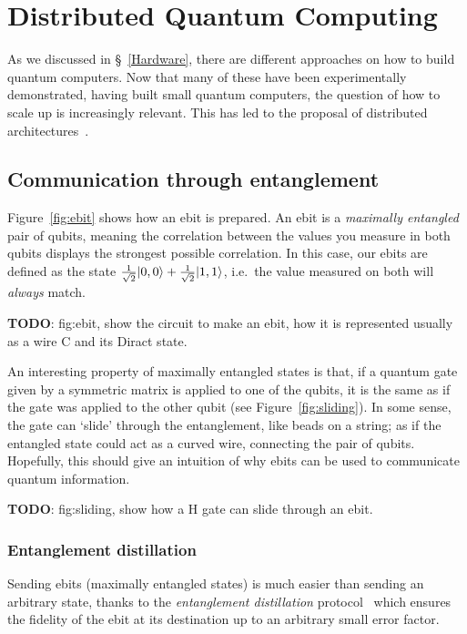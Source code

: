 \chapter{Distributed Quantum Computing}
\label{chap:Distributed}

As we discussed in \S~\ref{Hardware}, there are different approaches on how to build quantum computers. Now that many of these have been experimentally demonstrated, having built small quantum computers, the question of how to scale up is increasingly relevant. This has led to the proposal of distributed architectures~\citep{ArchitectureSurvey}.

\section{Communication through entanglement}
\label{Ebits}


Figure~\ref{fig:ebit} shows how an ebit is prepared. An ebit is a \textit{maximally entangled} pair of qubits, meaning the correlation between the values you measure in both qubits displays the strongest possible correlation. In this case, our ebits are defined as the state \(\frac{1}{\sqrt{2}}\vert 0,0 \rangle + \frac{1}{\sqrt{2}}\vert 1,1 \rangle\), i.e.\ the value measured on both will \textit{always} match.

\textbf{TODO}: fig:ebit, show the circuit to make an ebit, how it is represented usually as a wire C and its Diract state.

An interesting property of maximally entangled states is that, if a quantum gate given by a symmetric matrix is applied to one of the qubits, it is the same as if the gate was applied to the other qubit (see Figure~\ref{fig:sliding}). In some sense, the gate can `slide' through the entanglement, like beads on a string; as if the entangled state could act as a curved wire, connecting the pair of qubits. Hopefully, this should give an intuition of why ebits can be used to communicate quantum information.

\textbf{TODO}: fig:sliding, show how a H gate can slide through an ebit.

\subsection{Entanglement distillation}
\label{Distillation}

Sending ebits (maximally entangled states) is much easier than sending an arbitrary state, thanks to the \textit{entanglement distillation} protocol~\citep{DistillationProtocol} which ensures the fidelity of the ebit at its destination up to an arbitrary small error factor.

